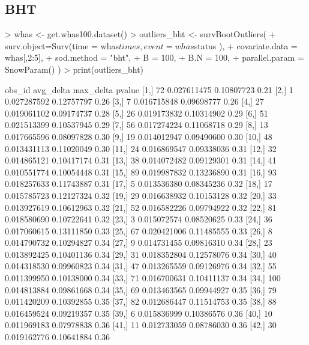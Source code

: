 \documentclass{article}
\begin{document}
\subsection{BHT}

\begin{Schunk}
\begin{Sinput}
> whas <- get.whas100.dataset()
> outliers_bht <- survBootOutliers( 
+     surv.object=Surv(time = whas$times,event = whas$status ),
+     covariate.data = whas[,2:5],
+     sod.method = "bht",
+     B = 100,
+     B.N = 100,
+     parallel.param = SnowParam() )
> print(outliers_bht)
\end{Sinput}
\begin{Soutput}
       obs_id   avg_delta  max_delta pvalue
  [1,]     72 0.027611475 0.10807723   0.21
  [2,]      1 0.027287592 0.12757797   0.26
  [3,]      7 0.016715848 0.09698777   0.26
  [4,]     27 0.019061102 0.09174737   0.28
  [5,]     26 0.019173832 0.10314902   0.29
  [6,]     51 0.021513399 0.10537945   0.29
  [7,]     56 0.017274224 0.11068718   0.29
  [8,]     13 0.017665596 0.08097828   0.30
  [9,]     19 0.014012947 0.09490600   0.30
 [10,]     48 0.013431113 0.11020049   0.30
 [11,]     24 0.016869547 0.09338036   0.31
 [12,]     32 0.014865121 0.10417174   0.31
 [13,]     38 0.014072482 0.09129301   0.31
 [14,]     41 0.010551774 0.10054448   0.31
 [15,]     89 0.019987832 0.13236890   0.31
 [16,]     93 0.018257633 0.11743887   0.31
 [17,]      5 0.013536380 0.08345236   0.32
 [18,]     17 0.015785723 0.12127324   0.32
 [19,]     29 0.016638932 0.10153128   0.32
 [20,]     33 0.013927619 0.10612963   0.32
 [21,]     52 0.016582226 0.09794922   0.32
 [22,]     81 0.018580690 0.10722641   0.32
 [23,]      3 0.015072574 0.08520625   0.33
 [24,]     36 0.017060615 0.13111850   0.33
 [25,]     67 0.020421006 0.11485555   0.33
 [26,]      8 0.014790732 0.10294827   0.34
 [27,]      9 0.014731455 0.09816310   0.34
 [28,]     23 0.013892425 0.10401136   0.34
 [29,]     31 0.018352804 0.12578076   0.34
 [30,]     40 0.014318530 0.09960823   0.34
 [31,]     47 0.013265559 0.09126976   0.34
 [32,]     55 0.011399950 0.10138000   0.34
 [33,]     71 0.016700631 0.10411137   0.34
 [34,]    100 0.014813884 0.09861668   0.34
 [35,]     69 0.013463565 0.09944927   0.35
 [36,]     79 0.011420209 0.10392855   0.35
 [37,]     82 0.012686447 0.11514753   0.35
 [38,]     88 0.016459524 0.09219357   0.35
 [39,]      6 0.015836999 0.10386576   0.36
 [40,]     10 0.011969183 0.07978838   0.36
 [41,]     11 0.012733059 0.08786030   0.36
 [42,]     30 0.019162776 0.10641884   0.36

\end{Soutput}
\end{Schunk}
\end{document}
